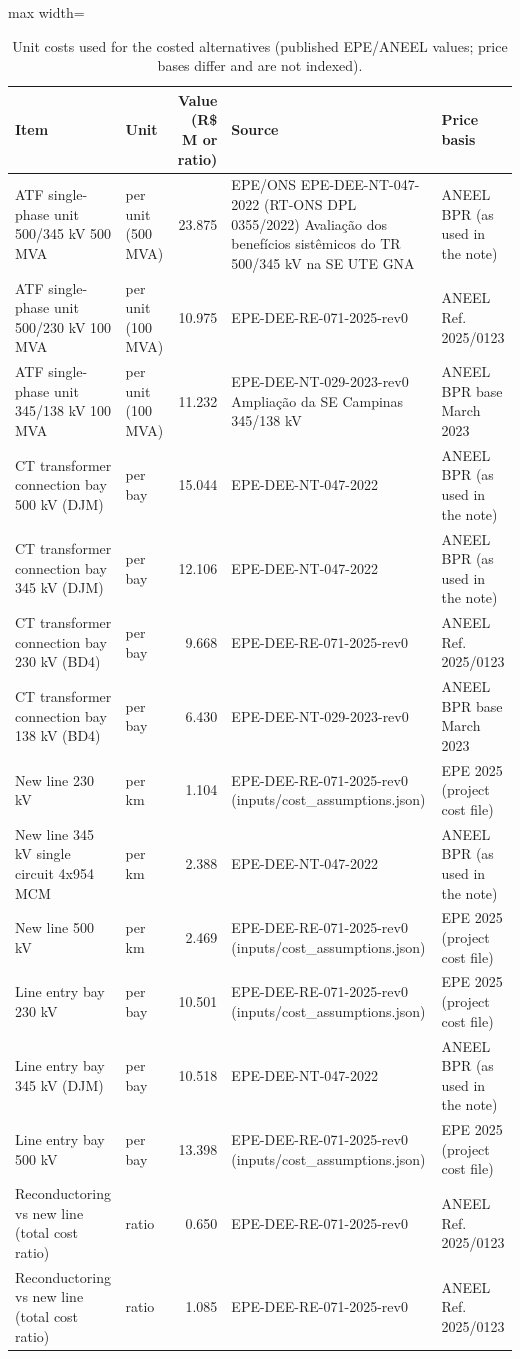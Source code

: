 \begin{table}[!htbp]
\centering
\scriptsize
\caption{Unit costs used for the costed alternatives (published EPE/ANEEL values; price bases differ and are not indexed).}
\label{tab:unitcosts}
\begin{adjustbox}{max width=\linewidth}
\begin{tabular}{>{\raggedright\arraybackslash}p{3.6cm}>{\raggedright\arraybackslash}p{1.7cm}r>{\raggedright\arraybackslash}p{5.4cm}>{\raggedright\arraybackslash}p{2.6cm}}
\toprule
Item & Unit & Value (R\$ M or ratio) & Source & Price basis \\
\midrule
ATF single-phase unit 500/345 kV 500 MVA & per unit (500 MVA) & 23.875 & EPE/ONS EPE-DEE-NT-047-2022 (RT-ONS DPL 0355/2022) Avaliação dos benefícios sistêmicos do TR 500/345 kV na SE UTE GNA & ANEEL BPR (as used in the note) \\
ATF single-phase unit 500/230 kV 100 MVA & per unit (100 MVA) & 10.975 & EPE-DEE-RE-071-2025-rev0 & ANEEL Ref. 2025/0123 \\
ATF single-phase unit 345/138 kV 100 MVA & per unit (100 MVA) & 11.232 & EPE-DEE-NT-029-2023-rev0 Ampliação da SE Campinas 345/138 kV & ANEEL BPR base March 2023 \\
CT transformer connection bay 500 kV (DJM) & per bay & 15.044 & EPE-DEE-NT-047-2022 & ANEEL BPR (as used in the note) \\
CT transformer connection bay 345 kV (DJM) & per bay & 12.106 & EPE-DEE-NT-047-2022 & ANEEL BPR (as used in the note) \\
CT transformer connection bay 230 kV (BD4) & per bay & 9.668 & EPE-DEE-RE-071-2025-rev0 & ANEEL Ref. 2025/0123 \\
CT transformer connection bay 138 kV (BD4) & per bay & 6.430 & EPE-DEE-NT-029-2023-rev0 & ANEEL BPR base March 2023 \\
New line 230 kV & per km & 1.104 & EPE-DEE-RE-071-2025-rev0 (inputs/cost\_assumptions.json) & EPE 2025 (project cost file) \\
New line 345 kV single circuit 4x954 MCM & per km & 2.388 & EPE-DEE-NT-047-2022 & ANEEL BPR (as used in the note) \\
New line 500 kV & per km & 2.469 & EPE-DEE-RE-071-2025-rev0 (inputs/cost\_assumptions.json) & EPE 2025 (project cost file) \\
Line entry bay 230 kV & per bay & 10.501 & EPE-DEE-RE-071-2025-rev0 (inputs/cost\_assumptions.json) & EPE 2025 (project cost file) \\
Line entry bay 345 kV (DJM) & per bay & 10.518 & EPE-DEE-NT-047-2022 & ANEEL BPR (as used in the note) \\
Line entry bay 500 kV & per bay & 13.398 & EPE-DEE-RE-071-2025-rev0 (inputs/cost\_assumptions.json) & EPE 2025 (project cost file) \\
Reconductoring vs new line (total cost ratio) & ratio & 0.650 & EPE-DEE-RE-071-2025-rev0 & ANEEL Ref. 2025/0123 \\
Reconductoring vs new line (total cost ratio) & ratio & 1.085 & EPE-DEE-RE-071-2025-rev0 & ANEEL Ref. 2025/0123 \\
\bottomrule
\end{tabular}
\end{adjustbox}
\end{table}
